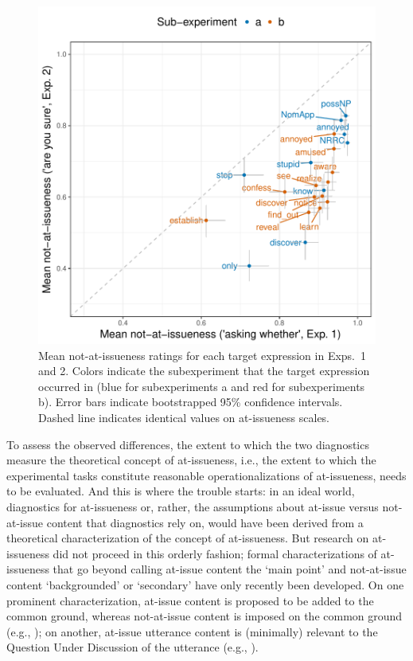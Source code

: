 \documentclass[11pt,fleqn]{article}
\newcommand{\6}{\mbox{$[\hspace*{-.6mm}[$}}
\newcommand{\9}{\mbox{$]\hspace*{-.6mm}]$}}
\begin{document}
\begin{figure}[!h]
\begin{center}

\includegraphics[width=12cm]{../results/ai-meta-analysis/graphs/correlation-bytrigger}

\end{center}
\caption{Mean not-at-issueness ratings for each target expression in Exps.~1 and 2. Colors indicate the subexperiment that the target expression occurred in (blue for subexperiments a and red for subexperiments b). Error bars indicate bootstrapped 95\% confidence intervals. Dashed line indicates identical values on at-issueness scales.}
\label{fig:ai-correlation}
\end{figure}


To assess the observed differences, the extent to which the two diagnostics measure the theoretical concept of at-issueness, i.e., the extent to which the experimental tasks constitute reasonable operationalizations of at-issueness, needs to be evaluated. And this is where the trouble starts: in an ideal world, diagnostics for at-issueness or, rather, the assumptions about at-issue versus not-at-issue content that diagnostics rely on, would have been derived from a theoretical characterization of the concept of at-issueness. But research on at-issueness did not proceed in this orderly fashion;  formal characterizations of at-issueness that go beyond calling at-issue content the `main point' and not-at-issue content `backgrounded' or `secondary' have only recently been developed. On one prominent characterization, at-issue content is proposed to be added to the common ground, whereas not-at-issue content is imposed on the common ground (e.g., \citealt{murray2014,anderbois-etal2015}); on another, at-issue utterance content is (minimally) relevant to the Question Under Discussion of the utterance (e.g., \citealt{brst-salt10,brst-ar}). 
\end{document}
